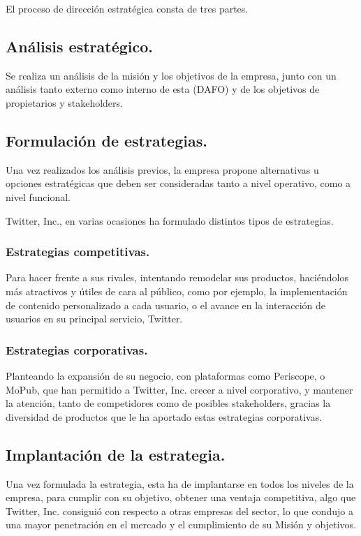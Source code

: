 El proceso de dirección estratégica consta de tres partes.

\subsection{Análisis estratégico.}

Se realiza un análisis de la misión y los objetivos de la empresa, junto con un análisis tanto externo como interno de esta (DAFO) y de los objetivos de propietarios y stakeholders.

\subsection{Formulación de estrategias.}

Una vez realizados los análisis previos, la empresa propone alternativas u opciones estratégicas  que deben ser consideradas tanto a nivel operativo, como a nivel funcional.

Twitter, Inc., en varias ocasiones ha formulado distintos tipos de estrategias.

\subsubsection{Estrategias competitivas.}

Para hacer frente a sus rivales, intentando remodelar sus productos, haciéndolos más atractivos y útiles de cara al público, como por ejemplo, la implementación de contenido personalizado a cada usuario, o el avance en la interacción de usuarios en su principal servicio, Twitter.

\subsubsection{Estrategias corporativas.}

Planteando la expansión de su negocio, con plataformas como Periscope, o MoPub, que han permitido a Twitter, Inc. crecer a nivel corporativo, y mantener la atención, tanto de competidores como de posibles stakeholders, gracias la diversidad de productos que le ha aportado estas estrategias corporativas.

\subsection{Implantación de la estrategia.}

Una vez formulada la estrategia, esta ha de implantarse en todos los niveles de la empresa, para cumplir con su objetivo, obtener una ventaja competitiva, algo que Twitter, Inc. consiguió con respecto a otras empresas del sector, lo que condujo a una mayor penetración en el mercado y el cumplimiento de su Misión y objetivos.


